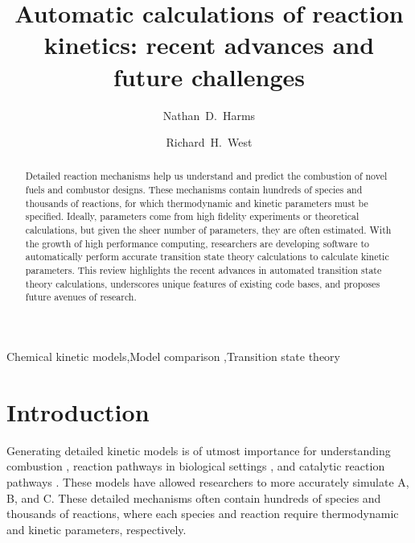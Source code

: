 \documentclass[preprint, 11pt]{elsarticle} %
\begin{document}
\begin{frontmatter}

\title{Automatic calculations of reaction kinetics: recent advances and future challenges}

\author[neu]{Nathan~D.~Harms}
\author[neu]{Richard~H.~West}%

\address[neu]{Department of Chemical Engineering\\
Northeastern University, Boston, MA 02115, USA}


\begin{abstract}

Detailed reaction mechanisms help us understand and predict the combustion of novel fuels and combustor designs.
These mechanisms contain hundreds of species and thousands of reactions, for which thermodynamic and kinetic parameters must be specified.
Ideally, parameters come from high fidelity experiments or theoretical calculations, but given the sheer number of parameters, they are often estimated.
With the growth of high performance computing, researchers are developing software to automatically perform accurate transition state theory calculations to calculate kinetic parameters. 
This review highlights the recent advances in automated transition state theory calculations, underscores unique features of existing code bases, and proposes future avenues of research.

\end{abstract}


\begin{keyword}
    Chemical kinetic models\sep Model comparison \sep Transition state theory
\end{keyword}

\end{frontmatter}


\section{Introduction}
% 
Generating detailed kinetic models is of utmost importance for understanding combustion , reaction pathways in biological settings , and catalytic reaction pathways .
These models have allowed researchers to more accurately simulate A, B, and C. 
These detailed mechanisms often contain hundreds of species and thousands of reactions, where each species and reaction require thermodynamic and kinetic parameters, respectively.  
\end{document}
